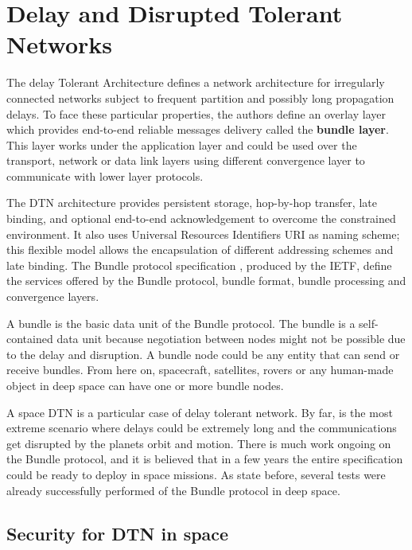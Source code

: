 \section{Delay and Disrupted Tolerant Networks}
\label{sec:dtn}

The delay Tolerant Architecture \cite{cerf2007delay} defines a network architecture for irregularly connected networks subject to frequent partition and possibly long propagation delays. To face these particular properties, the authors define an overlay layer which provides end-to-end reliable messages delivery called the \textbf{bundle layer}. This layer works under the application layer and could be used over the transport, network or data link layers using different convergence layer to communicate with lower layer protocols. 

The DTN architecture provides persistent storage, hop-by-hop transfer, late binding, and optional end-to-end acknowledgement to overcome the constrained environment. It also uses Universal Resources Identifiers URI  as naming scheme; this flexible model allows the encapsulation of different addressing schemes and late binding. The Bundle protocol specification \cite{rfc5050}, produced by the IETF,  define the services offered by the Bundle protocol, bundle format, bundle processing and convergence layers. 

A bundle is the basic data unit of the Bundle protocol. The bundle is a self-contained data unit because negotiation between nodes might not be possible due to the delay and disruption. A bundle node could be any entity that can send or receive bundles. From here on, spacecraft, satellites, rovers or any human-made object in deep space can have one or more bundle nodes. 

A space DTN is a particular case of delay tolerant network. By far, is the most extreme scenario where delays could be extremely long and the communications get disrupted by the planets orbit and motion. There is much work ongoing on the Bundle protocol, and it is believed that in a few years the entire specification could be ready to deploy in space missions. As state before, several tests were already successfully performed of the Bundle protocol in deep space.




\subsection{Security for DTN in space}


